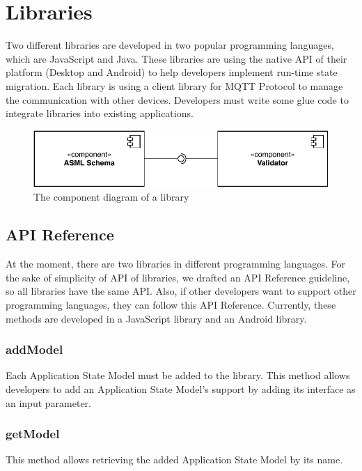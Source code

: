 \section{Libraries}
Two different libraries are developed in two popular programming languages, which are JavaScript and Java. These libraries are using the native API of their platform (Desktop and Android) to help developers implement run-time state migration. Each library is using a client library for MQTT Protocol to manage the communication with other devices. Developers must write some glue code to integrate libraries into existing applications.

\FloatBarrier
\begin{figure}[H]
    \includegraphics[width=\linewidth]{../figures/libraries-diagram}
    \centering
    \caption{The component diagram of a library}
    \label{fig:mvp}
\end{figure}
\FloatBarrier

\subsection{API Reference}
At the moment, there are two libraries in different programming languages. For the sake of simplicity of API of libraries, we drafted an API Reference guideline, so all libraries have the same API. Also, if other developers want to support other programming languages, they can follow this API Reference. Currently, these methods are developed in a JavaScript library and an Android library.

\subsubsection{addModel}
Each Application State Model must be added to the library. This method allows developers to add an Application State Model's support by adding its interface as an input parameter.

\subsubsection{getModel}
This method allows retrieving the added Application State Model by its name.

